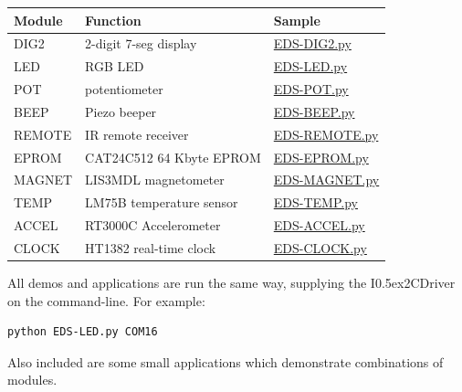 \documentclass{article}
\newcommand{\two}{\raise0.5ex\hbox{\footnotesize{2}}}
\newcommand{\iicdriver}{I\two{}CDriver}
\newcommand{\gap}{\vspace{10pt}}
\begin{document}
\begin{center}\begin{tabular}{lll}
\hline
Module & Function                 & Sample \\
\hline
DIG2   & 2-digit 7-seg display    & \href{https://github.com/jamesbowman/i2cdriver/blob/master/python/samples/EDS-DIG2.py}{EDS-DIG2.py} \\
LED    & RGB LED                  & \href{https://github.com/jamesbowman/i2cdriver/blob/master/python/samples/EDS-LED.py}{EDS-LED.py} \\
POT    & potentiometer            & \href{https://github.com/jamesbowman/i2cdriver/blob/master/python/samples/EDS-POT.py}{EDS-POT.py} \\
BEEP   & Piezo beeper             & \href{https://github.com/jamesbowman/i2cdriver/blob/master/python/samples/EDS-BEEP.py}{EDS-BEEP.py} \\
REMOTE & IR remote receiver       & \href{https://github.com/jamesbowman/i2cdriver/blob/master/python/samples/EDS-REMOTE.py}{EDS-REMOTE.py} \\
EPROM  & CAT24C512 64 Kbyte EPROM & \href{https://github.com/jamesbowman/i2cdriver/blob/master/python/samples/EDS-EPROM.py}{EDS-EPROM.py} \\
MAGNET & LIS3MDL magnetometer     & \href{https://github.com/jamesbowman/i2cdriver/blob/master/python/samples/EDS-MAGNET.py}{EDS-MAGNET.py} \\
TEMP   & LM75B temperature sensor & \href{https://github.com/jamesbowman/i2cdriver/blob/master/python/samples/EDS-TEMP.py}{EDS-TEMP.py} \\
ACCEL  & RT3000C Accelerometer    & \href{https://github.com/jamesbowman/i2cdriver/blob/master/python/samples/EDS-ACCEL.py}{EDS-ACCEL.py} \\
CLOCK  & HT1382 real-time clock   & \href{https://github.com/jamesbowman/i2cdriver/blob/master/python/samples/EDS-CLOCK.py}{EDS-CLOCK.py} \\
\hline
\end{tabular}\end{center}\gap


All demos and applications are run the same way, supplying the \iicdriver{} on the command-line. For example:

\begin{lstlisting}
python EDS-LED.py COM16
\end{lstlisting}

Also included are some small applications which demonstrate combinations of modules.
\end{document}
